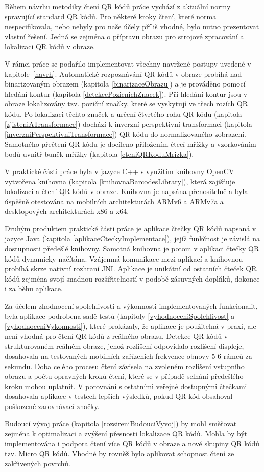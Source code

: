 Během návrhu metodiky čtení QR kódů práce vychází z aktuální normy
spravující standard QR kódů. Pro některé kroky čtení, které norma
nespecifikovala, nebo nebyly pro naše účely příliš vhodné, bylo nutno
prezentovat vlastní řešení. Jedná se zejména o přípravu obrazu pro strojové
zpracování a lokalizaci QR kódů v obraze.

V rámci práce se podařilo implementovat všechny navržené postupy uvedené v
kapitole~\ref{navrh}. Automatické rozpoznávání QR kódů v obraze probíhá nad
binarizovaným obrazem (kapitola \ref{binarizaceObrazu}) a je prováděno pomocí
hledání kontur (kapitola \ref{detekcePozicnichZnacek}). Při hledání kontur jsou v obraze
lokalizovány tzv. poziční značky, které se vyskytují ve třech rozích QR kódu.
Po lokalizaci těchto značek a určení čtvrtého rohu QR
kódu (kapitola \ref{zjisteniATransformace}) dochází k inverzní perspektivní
transformaci (kapitola \ref{inverzniPerspektivniTransformace})
QR kódu do normalizovaného zobrazení. Samotného přečtení QR kódu je docíleno
přiložením čtecí mřížky a vzorkováním bodů uvnitř buněk mřížky (kapitola
\ref{cteniQRKoduMrizka}).

V praktické části práce byla v jazyce C++ s využitím knihovny OpenCV vytvořena
knihovna (kapitola \ref{knihovnaBarcodesLibrary}), která zajišťuje lokalizaci a
čtení QR kódů v obraze.
Knihovna je napsána přenositelně a byla úspěšně otestována na mobilních architekturách
ARMv6 a ARMv7a a desktopových architekturách x86 a x64.

Druhým produktem praktické části práce je aplikace čtečky QR kódů napsaná v
jazyce Java (kapitola \ref{aplikaceCteckyImplementace}), jejíž funkčnost je
závislá na dostupnosti předešlé knihovny.
Samotná knihovna je potom v aplikaci čtečky QR kódů dynamicky načítána. Vzájemná
komunikace mezi aplikací a knihovnou probíhá skrze nativní rozhraní JNI.
Aplikace je unikátní od ostatních čteček QR kódů zejména svojí snadnou
rozšiřitelností v podobě zásuvných doplňků, dokonce i za běhu aplikace.

Za účelem zhodnocení spolehlivosti a výkonnosti implementovaných funkcionalit,
byla aplikace podrobena sadě testů (kapitoly \ref{vyhodnoceniSpolehlivost} a
\ref{vyhodnoceniVykonnosti}), které prokázaly, že aplikace je použitelná
v praxi, ale není vhodná pro čtení QR kódů z reálného obrazu.
Detekce QR kódů v  strukturovaném reálném obraze, jehož rozlišení
odpovídalo rozlišení displeje, dosahovala na testovaných mobilních zařízeních
frekvence obnovy 5-6 rámců za sekundu. Doba celého procesu čtení závisela na
zvoleném rozlišení vstupního obrazu a počtu opravných kroků čtení, které se v
případě selhání předešlého kroku mohou uplatnit. V porovnání s ostatními
veřejně dostupnými čtečkami dosahovala aplikace v testech lepších výsledků,
pokud QR kód obsahoval poškozené zarovnávací značky.

Budoucí vývoj práce (kapitola \ref{rozsireniBudouciVyvoj}) by mohl směřovat zejména k optimalizaci
a zvýšení přesnosti lokalizace QR kódů. Mohla by být implementována i podpora čtení více
QR kódů v obraze a nové skupiny QR kódů tzv. Micro QR kódů. Vhodné by rovněž
bylo aplikovat schopnost čtení ze zakřivených povrchů.
